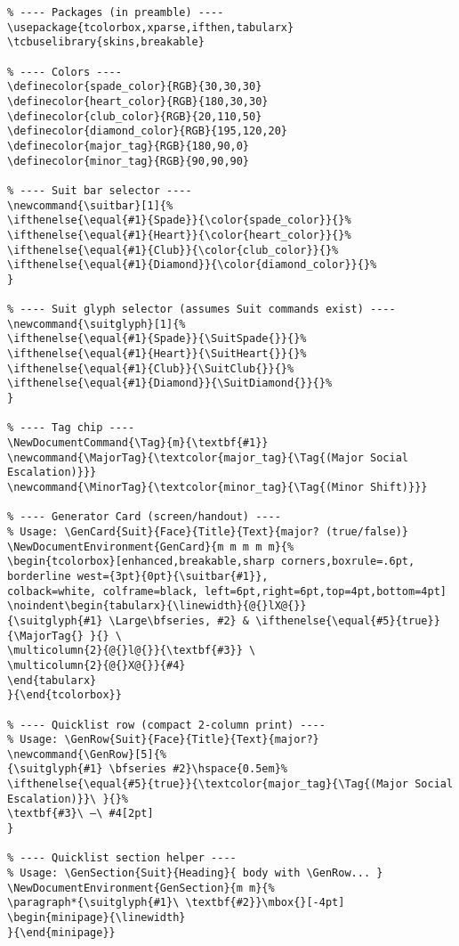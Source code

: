 \begin{verbatim}
% ---- Packages (in preamble) ----
\usepackage{tcolorbox,xparse,ifthen,tabularx}
\tcbuselibrary{skins,breakable}

% ---- Colors ----
\definecolor{spade_color}{RGB}{30,30,30}
\definecolor{heart_color}{RGB}{180,30,30}
\definecolor{club_color}{RGB}{20,110,50}
\definecolor{diamond_color}{RGB}{195,120,20}
\definecolor{major_tag}{RGB}{180,90,0}
\definecolor{minor_tag}{RGB}{90,90,90}

% ---- Suit bar selector ----
\newcommand{\suitbar}[1]{%
\ifthenelse{\equal{#1}{Spade}}{\color{spade_color}}{}%
\ifthenelse{\equal{#1}{Heart}}{\color{heart_color}}{}%
\ifthenelse{\equal{#1}{Club}}{\color{club_color}}{}%
\ifthenelse{\equal{#1}{Diamond}}{\color{diamond_color}}{}%
}

% ---- Suit glyph selector (assumes Suit commands exist) ----
\newcommand{\suitglyph}[1]{%
\ifthenelse{\equal{#1}{Spade}}{\SuitSpade{}}{}%
\ifthenelse{\equal{#1}{Heart}}{\SuitHeart{}}{}%
\ifthenelse{\equal{#1}{Club}}{\SuitClub{}}{}%
\ifthenelse{\equal{#1}{Diamond}}{\SuitDiamond{}}{}%
}

% ---- Tag chip ----
\NewDocumentCommand{\Tag}{m}{\textbf{#1}}
\newcommand{\MajorTag}{\textcolor{major_tag}{\Tag{(Major Social Escalation)}}}
\newcommand{\MinorTag}{\textcolor{minor_tag}{\Tag{(Minor Shift)}}}

% ---- Generator Card (screen/handout) ----
% Usage: \GenCard{Suit}{Face}{Title}{Text}{major? (true/false)}
\NewDocumentEnvironment{GenCard}{m m m m m}{%
\begin{tcolorbox}[enhanced,breakable,sharp corners,boxrule=.6pt,
borderline west={3pt}{0pt}{\suitbar{#1}},
colback=white, colframe=black, left=6pt,right=6pt,top=4pt,bottom=4pt]
\noindent\begin{tabularx}{\linewidth}{@{}lX@{}}
{\suitglyph{#1} \Large\bfseries, #2} & \ifthenelse{\equal{#5}{true}}{\MajorTag{} }{} \
\multicolumn{2}{@{}l@{}}{\textbf{#3}} \
\multicolumn{2}{@{}X@{}}{#4}
\end{tabularx}
}{\end{tcolorbox}}

% ---- Quicklist row (compact 2-column print) ----
% Usage: \GenRow{Suit}{Face}{Title}{Text}{major?}
\newcommand{\GenRow}[5]{%
{\suitglyph{#1} \bfseries #2}\hspace{0.5em}%
\ifthenelse{\equal{#5}{true}}{\textcolor{major_tag}{\Tag{(Major Social Escalation)}}\ }{}%
\textbf{#3}\ —\ #4[2pt]
}

% ---- Quicklist section helper ----
% Usage: \GenSection{Suit}{Heading}{ body with \GenRow... }
\NewDocumentEnvironment{GenSection}{m m}{%
\paragraph*{\suitglyph{#1}\ \textbf{#2}}\mbox{}[-4pt]
\begin{minipage}{\linewidth}
}{\end{minipage}}
\end{verbatim}

